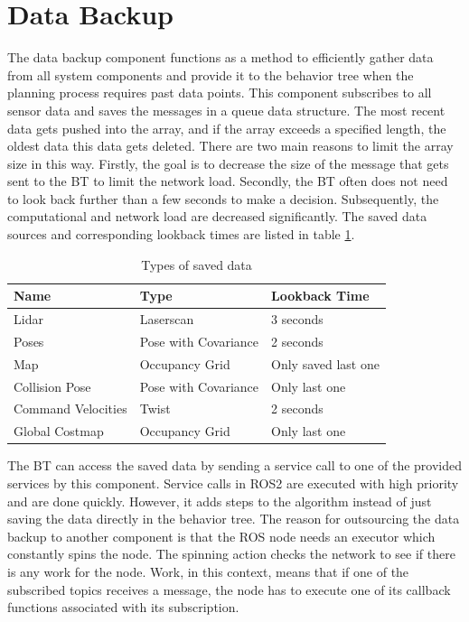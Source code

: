 \section{Data Backup}

The data backup component functions as a method to efficiently gather data from all system components and provide it to the behavior tree when the planning process requires past data points. This component subscribes to all sensor data and saves the messages in a queue data structure. The most recent data gets pushed into the array, and if the array exceeds a specified length, the oldest data this data gets deleted. There are two main reasons to limit the array size in this way. Firstly, the goal is to decrease the size of the message that gets sent to the BT to limit the network load. Secondly, the BT often does not need to look back further than a few seconds to make a decision. Subsequently, the computational and network load are decreased significantly. The saved data sources and corresponding lookback times are listed in table \ref{tab:data_backup_types}. 

\begin{table}[ht]
	\centering
	\caption{Types of saved data}
	\label{tab:data_backup_types}
	\renewcommand{\arraystretch}{1.5}
	\begin{tabular}{ | l | l | l | }
		\hline
		\textbf{Name} & \textbf{Type} & \textbf{Lookback Time} \\ 
		\hline
		Lidar & Laserscan & 3 seconds \\
		\hline
		Poses & Pose with Covariance & 2 seconds\\ 
		\hline
		Map & Occupancy Grid & Only saved last one \\ 
		\hline
		Collision Pose & Pose with Covariance & Only last one \\
		\hline
		Command Velocities & Twist & 2 seconds\\
		\hline 	
		Global Costmap & Occupancy Grid & Only last one \\
		\hline
	\end{tabular}
\end{table}

The BT can access the saved data by sending a service call to one of the provided services by this component. Service calls in ROS2 are executed with high priority and are done quickly. However, it adds steps to the algorithm instead of just saving the data directly in the behavior tree. The reason for outsourcing the data backup to another component is that the ROS node needs an executor which constantly spins the node. The spinning action checks the network to see if there is any work for the node. Work, in this context, means that if one of the subscribed topics receives a message, the node has to execute one of its callback functions associated with its subscription. 

